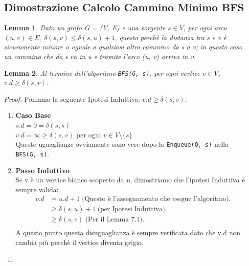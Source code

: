 \documentclass{article}
\newtheorem{lemma}{Lemma}[section]
\begin{document}
\subsection{Dimostrazione Calcolo Cammino Minimo BFS}

\begin{lemma}
    Dato un grafo G = (V, E) e una sorgente $s \in V$, per ogni arco $(u, v) \in E$, 
    $\delta(s, v) \leq \delta(s, u) + 1$, questo perchè la distanza tra s e v è sicuramente minore 
    o uguale a qualsiasi altro cammino da s a v; in questo caso un cammino che da s va in u e tramite l'arco (u, v) arriva in v. 
\end{lemma}

\begin{lemma}
    Al termine dell'algoritmo \verb|BFS(G, s)|, per ogni vertice $v \in V$, $v.d \geq \delta(s, v)$.
\end{lemma}

\begin{proof}
    Poniamo la seguente Ipotesi Induttiva: $v.d \geq \delta(s, v)$. \\
    \begin{enumerate}
        \item[\textbf{1)}] \textbf{Caso Base} \\
        $s.d = 0 = \delta(s, s)$ \\
        $v.d = \infty \geq \delta(s, v)$ per ogni $v \in V$\textbackslash$\{s\}$ \\
        Queste uguaglianze ovviamente sono vere dopo la \verb|Enqueue(Q, s)| nella \verb|BFS(G, s)|.
        \item[\textbf{2)}] \textbf{Passo Induttivo} \\
        Se v è un vertice bianco scoperto da u, dimostriamo che l'ipotesi Induttiva è sempre valida: \\
        \begin{equation*}
            \begin{split}
                v.d & = u.d + 1 \; \text{(Questo è l'assegnamento che esegue l'algoritmo).} \\
                & \geq \delta(s, u) + 1 \; \text{(per Ipotesi Induttiva).} \\
                & \geq \delta(s, v) \; \text{(Per il Lemma 7.1).} \\
            \end{split}
        \end{equation*}
        A questo punto questa disuguaglianza è sempre verificata dato che v.d non cambia più perchè il vertice diventa grigio. 
    \end{enumerate}
\end{proof}
\end{document}
